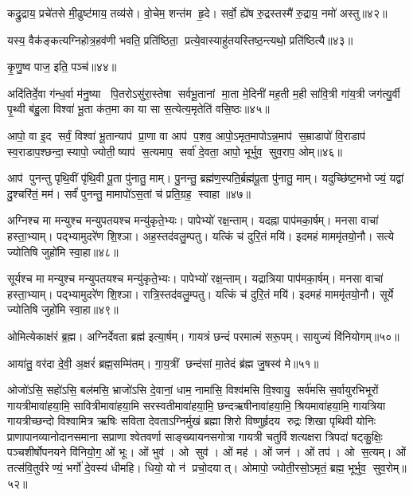 कद्रु॒द्राय॒ प्रचे॑तसे मी॒ढुष्ट॑माय॒ तव्य॑से। वो॒चेम॒ शन्त॑म हृ॒दे। सर्वो॒ ह्ये॑ष रु॒द्रस्तस्मै॑ रु॒द्राय॒ नमो॑ अस्तु॥४२॥
\anuvakamend

यस्य॒ वैक॑ङ्कत्यग्निहोत्र॒हव॑णी भवति॒ प्रति॑ष्ठिता॒ प्रत्ये॒वास्याहु॑तय\-स्तिष्ठ॒न्त्यथो॒ प्रति॑ष्ठित्यै॥४३॥
\anuvakamend


कृ॒णु॒ष्व पाज॒ इति॒ पञ्च॑॥४४॥
\anuvakamend

अदि॑तिर्दे॒वा ग॑न्ध॒र्वा म॑नु॒ष्या पि॒तरोऽसु॑रा॒स्तेषा सर्वभू॒तानां मा॒ता मे॒दिनी॑ मह॒ती म॒ही सा॑वि॒त्री गा॑य॒त्री जग॑त्यु॒र्वी पृ॒थ्वी ब॑हु॒ला विश्वा॑ भू॒ता क॑त॒मा का या सा स॒त्येत्य॒मृतेति॑ वसि॒ष्ठः॥४५॥
\anuvakamend

आपो॒ वा इ॒द सर्वं॒ विश्वा॑ भू॒तान्याप॑ प्रा॒णा वा आप॑ प॒शव॒ आपो॒ऽमृत॒मापोऽन्न॒माप॑ स॒म्राडापो॑ वि॒राडाप॑ स्व॒राडाप॒श्छन्दा॒स्यापो॒ ज्योती॒ष्याप॑ स॒त्यमाप॒ सर्वा॑ दे॒वता॒ आपो॒ भूर्भुव॒ सुव॒राप॒ ओम्॥४६॥
\anuvakamend

आप॑ पुनन्तु पृथि॒वीं पृ॑थि॒वी पू॒ता पु॑नातु॒ माम्। पु॒नन्तु॒ ब्रह्म॑ण॒स्पति॒र्ब्रह्म॑पू॒ता पु॑नातु॒ माम्। यदुच्छि॑ष्ट॒मभोज्यं॒ यद्वा॑ दु॒श्चरि॑तं॒ मम॑। सर्वं॑ पुनन्तु॒ मामापो॑ऽस॒तां च॑ प्रति॒ग्रह॒ स्वाहा॥४७॥
\anuvakamend


अग्निश्च मा मन्युश्च मन्युपतयश्च मन्यु॑कृते॒भ्यः। पापेभ्यो॑ रक्ष॒न्ताम्। यदह्ना पाप॑मका॒र्\mbox{}षम्। मनसा वाचा॑ हस्ता॒भ्याम्। पद्भ्यामुदरे॑ण शि॒श्ञा। अह॒स्तद॑वलु॒म्पतु। यत्किं च॑ दुरि॒तं मयि॑। इदमहं माममृ॑तयो॒नौ। सत्ये ज्योतिषि जुहो॑मि स्वा॒हा॥४८॥
\anuvakamend


सूर्यश्च मा मन्युश्च मन्युपतयश्च मन्यु॑कृते॒भ्यः। पापेभ्यो॑ रक्ष॒न्ताम्। यद्रात्रिया पाप॑मका॒र्\mbox{}षम्। मनसा वाचा॑ हस्ता॒भ्याम्। पद्भ्यामुदरे॑ण शि॒श्ञा। रात्रि॒स्तद॑वलु॒म्पतु। यत्किं च॑ दुरि॒तं मयि॑। इदमहं माममृ॑तयो॒नौ। सूर्ये ज्योतिषि जुहो॑मि स्वा॒हा॥४९॥
\anuvakamend

ओमित्येकाक्ष॑रं ब्र॒ह्म। अग्निर्देवता ब्रह्म॑ इत्या॒र्\mbox{}षम्। गायत्रं छन्दं परमात्मं सरू॒पम्। सायुज्यं वि॑नियोगम्॥५०॥
\anuvakamend

आया॑तु॒ वर॑दा दे॒वी॒ अ॒क्षरं॑ ब्रह्म॒सम्मि॑तम्। गा॒य॒त्रीं छन्द॑सां मा॒तेदं ब्र॑ह्म जु॒षस्व॑ मे॥५१॥ 
\anuvakamend

ओजो॑ऽसि॒ सहो॑ऽसि॒ बल॑मसि॒ भ्राजो॑ऽसि दे॒वानां॒ धाम॒ नामा॑सि॒ विश्व॑मसि वि॒श्वायु॒ सर्व॑मसि स॒र्वायुरभिभूरों गायत्रीमावा॑हया॒मि॒ सावित्रीमावा॑हया॒मि सरस्वतीमावा॑हया॒मि॒ छन्दऋषीनावा॑हया॒मि॒ श्रियमावा॑हया॒मि॒ गायत्रिया गायत्रीच्छन्दो विश्वामित्र ऋषिः सविता देवताऽग्निर्मुखं ब्रह्मा शिरो विष्णुर्\mbox{}हृदय रुद्रः शिखा पृथिवी योनिः प्राणापानव्यानोदानसमाना सप्राणा श्वेतवर्णा साङ्ख्यायनसगोत्रा गायत्री चतुर्विशत्यक्षरा त्रिपदा॑ षट्कु॒क्षिः॒ पञ्चशीर्\mbox{}षोपनयने वि॑नियो॒ग॒ ओं भूः। ओं भुव॑। ओ सुव॑। ओं मह॑। ओं जन॑। ओं तप॑। ओ स॒त्यम्। ओं तत्स॑वि॒तुर्वरेण्यं॒ भर्गो॑ दे॒वस्य॑ धीमहि। धियो॒ यो न॑ प्रचो॒दयात्। ओमापो॒ ज्योती॒रसो॒ऽमृतं॒ ब्रह्म॒ भूर्भुव॒ सुव॒रोम्॥५२॥
\anuvakamend


